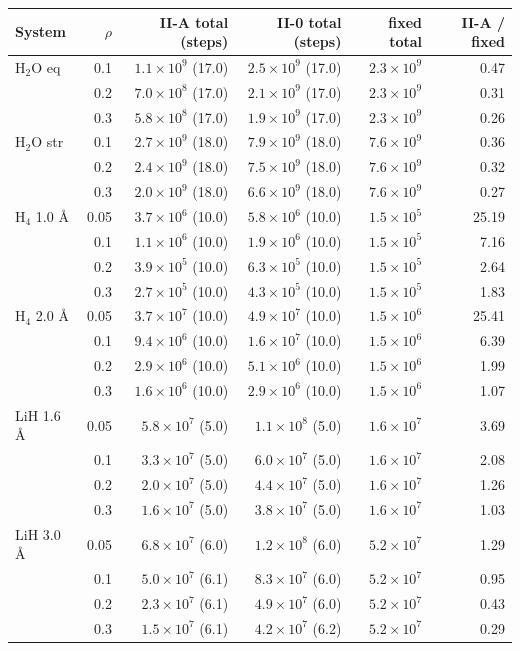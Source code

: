 \begin{tabular}{@{}lrrrrr@{}}
\toprule
System & $\rho$ & II-A total (steps) & II-0 total (steps) & fixed total & II-A / fixed \\
\midrule
H$_2$O eq & 0.1 & $1.1\times10^{9}$ (17.0) & $2.5\times10^{9}$ (17.0) & $2.3\times10^{9}$ & 0.47 \\
 & 0.2 & $7.0\times10^{8}$ (17.0) & $2.1\times10^{9}$ (17.0) & $2.3\times10^{9}$ & 0.31 \\
 & 0.3 & $5.8\times10^{8}$ (17.0) & $1.9\times10^{9}$ (17.0) & $2.3\times10^{9}$ & 0.26 \\
\midrule
H$_2$O str & 0.1 & $2.7\times10^{9}$ (18.0) & $7.9\times10^{9}$ (18.0) & $7.6\times10^{9}$ & 0.36 \\
 & 0.2 & $2.4\times10^{9}$ (18.0) & $7.5\times10^{9}$ (18.0) & $7.6\times10^{9}$ & 0.32 \\
 & 0.3 & $2.0\times10^{9}$ (18.0) & $6.6\times10^{9}$ (18.0) & $7.6\times10^{9}$ & 0.27 \\
\midrule
H$_4$ 1.0 \AA & 0.05 & $3.7\times10^{6}$ (10.0) & $5.8\times10^{6}$ (10.0) & $1.5\times10^{5}$ & 25.19 \\
 & 0.1 & $1.1\times10^{6}$ (10.0) & $1.9\times10^{6}$ (10.0) & $1.5\times10^{5}$ & 7.16 \\
 & 0.2 & $3.9\times10^{5}$ (10.0) & $6.3\times10^{5}$ (10.0) & $1.5\times10^{5}$ & 2.64 \\
 & 0.3 & $2.7\times10^{5}$ (10.0) & $4.3\times10^{5}$ (10.0) & $1.5\times10^{5}$ & 1.83 \\
\midrule
H$_4$ 2.0 \AA & 0.05 & $3.7\times10^{7}$ (10.0) & $4.9\times10^{7}$ (10.0) & $1.5\times10^{6}$ & 25.41 \\
 & 0.1 & $9.4\times10^{6}$ (10.0) & $1.6\times10^{7}$ (10.0) & $1.5\times10^{6}$ & 6.39 \\
 & 0.2 & $2.9\times10^{6}$ (10.0) & $5.1\times10^{6}$ (10.0) & $1.5\times10^{6}$ & 1.99 \\
 & 0.3 & $1.6\times10^{6}$ (10.0) & $2.9\times10^{6}$ (10.0) & $1.5\times10^{6}$ & 1.07 \\
\midrule
LiH 1.6 \AA & 0.05 & $5.8\times10^{7}$ (5.0) & $1.1\times10^{8}$ (5.0) & $1.6\times10^{7}$ & 3.69 \\
 & 0.1 & $3.3\times10^{7}$ (5.0) & $6.0\times10^{7}$ (5.0) & $1.6\times10^{7}$ & 2.08 \\
 & 0.2 & $2.0\times10^{7}$ (5.0) & $4.4\times10^{7}$ (5.0) & $1.6\times10^{7}$ & 1.26 \\
 & 0.3 & $1.6\times10^{7}$ (5.0) & $3.8\times10^{7}$ (5.0) & $1.6\times10^{7}$ & 1.03 \\
\midrule
LiH 3.0 \AA & 0.05 & $6.8\times10^{7}$ (6.0) & $1.2\times10^{8}$ (6.0) & $5.2\times10^{7}$ & 1.29 \\
 & 0.1 & $5.0\times10^{7}$ (6.1) & $8.3\times10^{7}$ (6.0) & $5.2\times10^{7}$ & 0.95 \\
 & 0.2 & $2.3\times10^{7}$ (6.1) & $4.9\times10^{7}$ (6.0) & $5.2\times10^{7}$ & 0.43 \\
 & 0.3 & $1.5\times10^{7}$ (6.1) & $4.2\times10^{7}$ (6.2) & $5.2\times10^{7}$ & 0.29 \\
\bottomrule
\end{tabular}
